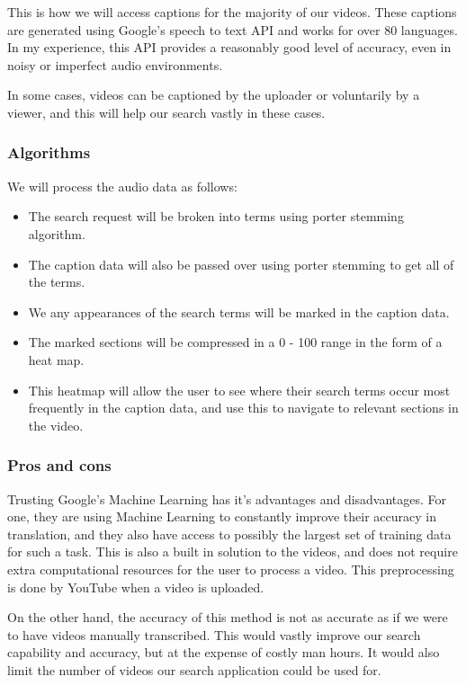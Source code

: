 \documentclass[a4paper,12pt]{article}
\let\footnote=\endnote
\begin{document}
This is how we will access captions for the majority of our videos. These captions are generated using Google's speech to text API and works for over 80 languages\footnote{https://cloud.google.com/speech/}. In my experience, this API provides a reasonably good level of accuracy, even in noisy or imperfect audio environments.

In some cases, videos can be captioned by the uploader or voluntarily by a viewer, and this will help our search vastly in these cases.


\subsubsection{Algorithms}
We will process the audio data as follows:

\begin{itemize}
    \item
        The search request will be broken into terms using porter stemming algorithm.
    \item
        The caption data will also be passed over using porter stemming to get all of the terms.
    \item
        We any appearances of the search terms will be marked in the caption data.
    \item
        The marked sections will be compressed in a 0 - 100 range in the form of a heat map.
    \item
        This heatmap will allow the user to see where their search terms occur most frequently in the caption data, and use this to navigate to relevant sections in the video.
\end{itemize}
\subsubsection{Pros and cons}
Trusting Google's Machine Learning has it's advantages and disadvantages. For one, they are using Machine Learning to constantly improve their accuracy in translation, and they also have access to possibly the largest set of training data for such a task. This is also a built in solution to the videos, and does not require extra computational resources for the user to process a video. This preprocessing is done by YouTube when a video is uploaded.

On the other hand, the accuracy of this method is not as accurate as if we were to have videos manually transcribed. This would vastly improve our search capability and accuracy, but at the expense of costly man hours. It would also limit the number of videos our search application could be used for.
\end{document}
